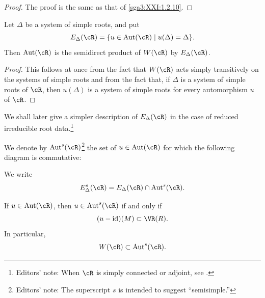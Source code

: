 \begin{proof}
The proof is the same as that of \ref{sga3:XXI:1.2.10}.
\end{proof}


\begin{proposition}\label{sga3:XXI:6.7.2}
Let \(\Delta\) be a system of simple roots, and put
\[
 E_\Delta(\cR)=
 \{u\in\operatorname{Aut}(\cR)\mid u(\Delta)=\Delta\}.
\]
Then \(\operatorname{Aut}(\cR)\) is the semidirect product of
\(W(\cR)\) by \(E_\Delta(\cR)\).
\end{proposition}

\begin{proof}
This follows at once from the fact that \(W(\cR)\) acts simply
transitively on the systems of simple roots and from the fact that,
if \(\Delta\) is a system of simple roots of \(\cR\), then
\(u(\Delta)\) is a system of simple roots for every automorphism
\(u\) of \(\cR\).
\end{proof}

We shall later give a simpler description of \(E_\Delta(\cR)\) in
the case of reduced irreducible root data.\footnote{Editors' note:
When \(\cR\) is simply connected or adjoint, see .}

\begin{definition}\label{sga3:XXI:6.7.3}
We denote by \(\operatorname{Aut}^{s}(\cR)\)\footnote{Editors' note:
The superscript \(s\) is intended to suggest ``semisimple.''}
the set of \(u\in\operatorname{Aut}(\cR)\) for which the following
diagram is commutative:
\begin{center}
\end{center}
We write
\[
 E_\Delta^{s}(\cR)
 =E_\Delta(\cR)\cap\operatorname{Aut}^{s}(\cR).
\]
\end{definition}

\begin{remark}\label{sga3:XXI:6.7.4}
If \(u\in\operatorname{Aut}(\cR)\), then
\(u\in\operatorname{Aut}^{s}(\cR)\) if and only if
\[
 (u-\operatorname{id})(M)\subset\VR(R).
\]
In particular,
\[
 W(\cR)\subset\operatorname{Aut}^{s}(\cR).
\]
\end{remark}


